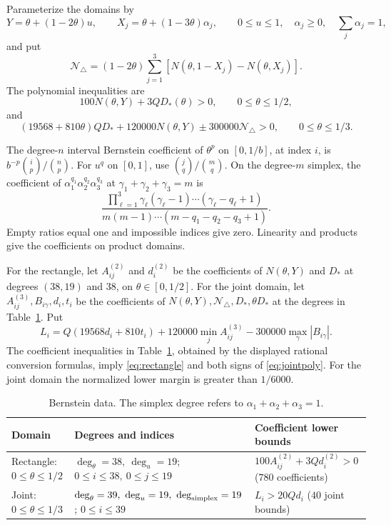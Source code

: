 \documentclass[11pt]{amsart}
\theoremstyle{remark}
\theoremstyle{plain}
\numberwithin{equation}{section}
\begin{document}
Parameterize the domains by
\[
 Y=\theta+(1-2\theta)u,\qquad
 X_j=\theta+(1-3\theta)\alpha_j,\qquad
 0\le u\le1,\quad\alpha_j\ge0,\quad\sum_j\alpha_j=1,
\]
and put
\[
 \mathcal N_\triangle=(1-2\theta)
 \sum_{j=1}^3[N(\theta,1-X_j)-N(\theta,X_j)].
\]
The polynomial inequalities are
\begin{equation}\label{eq:rectangle}
 100N(\theta,Y)+3QD_*(\theta)>0,
 \qquad 0\le\theta\le1/2,
\end{equation}
and
\begin{equation}\label{eq:jointpoly}
 (19568+810\theta)QD_*
 +120000N(\theta,Y)\pm300000\mathcal N_\triangle>0,
 \qquad 0\le\theta\le1/3.
\end{equation}

The degree-\(n\) interval Bernstein coefficient of \(\theta^p\) on
\([0,1/b]\), at index \(i\), is
\(b^{-p}\binom ip/\binom np\).
For \(u^q\) on \([0,1]\), use \(\binom jq/\binom mq\).
On the degree-\(m\) simplex, the coefficient of
\(\alpha_1^{q_1}\alpha_2^{q_2}\alpha_3^{q_3}\) at
\(\gamma_1+\gamma_2+\gamma_3=m\) is
\[
 \frac{\prod_{\ell=1}^3
 \gamma_\ell(\gamma_\ell-1)\cdots(\gamma_\ell-q_\ell+1)}
 {m(m-1)\cdots(m-q_1-q_2-q_3+1)}.
\]
Empty ratios equal one and impossible indices give zero.
Linearity and products give the coefficients on product domains.

For the rectangle, let \(A^{(2)}_{ij}\) and \(d_i^{(2)}\) be the
coefficients of \(N(\theta,Y)\) and \(D_*\) at degrees \((38,19)\)
and \(38\), on \(\theta\in[0,1/2]\).
For the joint domain, let \(A^{(3)}_{ij},B_{i\gamma},d_i,t_i\) be
the coefficients of \(N(\theta,Y),\mathcal N_\triangle,D_*,\theta D_*\)
at the degrees in Table~\ref{tab:bernstein}. Put
\[
 L_i=
 Q(19568d_i+810t_i)
 +120000\min_jA^{(3)}_{ij}
 -300000\max_\gamma|B_{i\gamma}|.
\]
The coefficient inequalities in Table~\ref{tab:bernstein}, obtained
by the displayed rational conversion formulas, imply
\eqref{eq:rectangle} and both signs of \eqref{eq:jointpoly}.
For the joint domain the normalized lower margin is greater than
\(1/6000\).

\begin{table}[ht]
\centering
\small
\caption{Bernstein data. The simplex degree refers to
\(\alpha_1+\alpha_2+\alpha_3=1\).}
\label{tab:bernstein}
\begin{tabular}{@{}p{}p{}p{}@{}}
\toprule
Domain & Degrees and indices & Coefficient lower bounds\\
\midrule
Rectangle:
\(0\le\theta\le1/2\) &
\(\deg_\theta=38,\ \deg_u=19\);
\(0\le i\le38,\ 0\le j\le19\) &
\(100A^{(2)}_{ij}+3Qd_i^{(2)}>0\)
(\(780\) coefficients)\\[3pt]
Joint:
\(0\le\theta\le1/3\) &
\(\deg_\theta=39,\ \deg_u=19,\ \deg_{\rm simplex}=19\);
\(0\le i\le39\) &
\(L_i>20Qd_i\)
(\(40\) joint bounds)\\
\bottomrule
\end{tabular}
\end{table}
\end{document}
